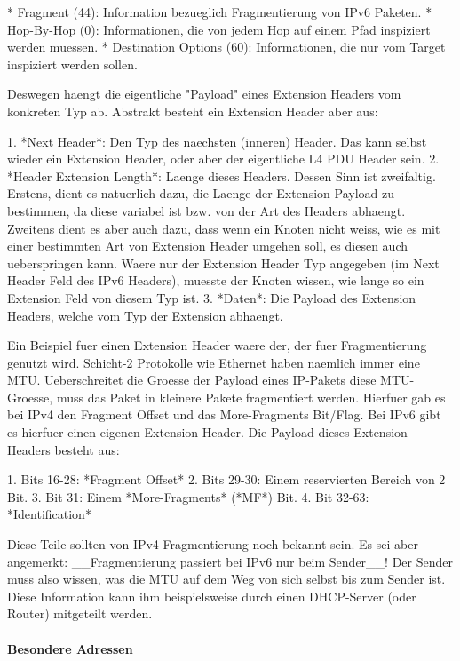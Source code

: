 * Fragment (44): Information bezueglich Fragmentierung von IPv6 Paketen.
* Hop-By-Hop (0): Informationen, die von jedem Hop auf einem Pfad inspiziert
  werden muessen.
* Destination Options (60): Informationen, die nur vom Target inspiziert werden
  sollen.

Deswegen haengt die eigentliche "Payload" eines Extension Headers vom konkreten
Typ ab. Abstrakt besteht ein Extension Header aber aus:

1. *Next Header*: Den Typ des naechsten (inneren) Header. Das kann selbst wieder
   ein Extension Header, oder aber der eigentliche L4 PDU Header sein.
2. *Header Extension Length*: Laenge dieses Headers. Dessen Sinn ist zweifaltig.
    Erstens, dient es natuerlich dazu, die Laenge der Extension Payload zu
    bestimmen, da diese variabel ist bzw. von der Art des Headers
    abhaengt. Zweitens dient es aber auch dazu, dass wenn ein Knoten nicht
    weiss, wie es mit einer bestimmten Art von Extension Header umgehen soll, es
    diesen auch ueberspringen kann. Waere nur der Extension Header Typ
    angegeben (im Next Header Feld des IPv6 Headers), muesste der Knoten wissen,
    wie lange so ein Extension Feld von diesem Typ ist.
3. *Daten*: Die Payload des Extension Headers, welche vom Typ der Extension
   abhaengt.

Ein Beispiel fuer einen Extension Header waere der, der fuer Fragmentierung
genutzt wird. Schicht-2 Protokolle wie Ethernet haben naemlich immer eine
MTU. Ueberschreitet die Groesse der Payload eines IP-Pakets diese MTU-Groesse,
muss das Paket in kleinere Pakete fragmentiert werden. Hierfuer gab es bei IPv4
den Fragment Offset und das More-Fragments Bit/Flag. Bei IPv6 gibt es hierfuer
einen eigenen Extension Header. Die Payload dieses Extension Headers besteht
aus:

1. Bits 16-28: *Fragment Offset*
2. Bits 29-30: Einem reservierten Bereich von 2 Bit.
3. Bit 31: Einem *More-Fragments* (*MF*) Bit.
4. Bit 32-63: *Identification*

Diese Teile sollten von IPv4 Fragmentierung noch bekannt sein. Es sei aber
angemerkt: \_\_Fragmentierung passiert bei IPv6 nur beim Sender\_\_! Der Sender muss
also wissen, was die MTU auf dem Weg von sich selbst bis zum Sender ist. Diese
Information kann ihm beispielsweise durch einen DHCP-Server (oder Router)
mitgeteilt werden.

\paragraph{Besondere Adressen} 

